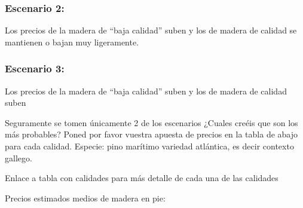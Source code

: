 \documentclass[]{article}
\begin{document}
\subsubsection{Escenario 2:}\label{escenario-2}

Los precios de la madera de ``baja calidad'' suben y los de madera de
calidad se mantienen o bajan muy ligeramente.

\subsubsection{Escenario 3:}\label{escenario-3}

Los precios de la madera de ``baja calidad'' suben y los de madera de
calidad suben

Seguramente se tomen únicamente 2 de los escenarios ¿Cuales creéis que
son los más probables? Poned por favor vuestra apuesta de precios en la
tabla de abajo para cada calidad. Especie: pino marítimo variedad
atlántica, es decir contexto gallego.

Enlace a tabla con calidades para más detalle de cada una de las
calidades

Precios estimados medios de madera en pie:
\end{document}
